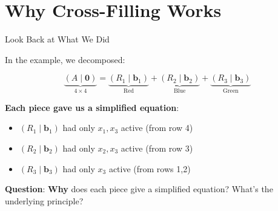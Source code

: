 \documentclass[10pt]{beamer}
\theoremstyle{definition}
\newcommand{\x}[1]{\alert{\textbf{#1}}}
\begin{document}
\section{Why Cross-Filling Works}

\begin{frame}{Look Back at What We Did}

In the example, we decomposed:

$$\underbrace{(A \mid \mathbf{0})}_{4 \times 4} = \underbrace{(R_1 \mid \mathbf{b}_1)}_{\text{Red}} + \underbrace{(R_2 \mid \mathbf{b}_2)}_{\text{Blue}} + \underbrace{(R_3 \mid \mathbf{b}_3)}_{\text{Green}}$$

\vspace{1em}

\x{Each piece gave us a simplified equation}:
\begin{itemize}
\item $(R_1 \mid \mathbf{b}_1)$ had only $x_1, x_3$ active (from row 4)
\item $(R_2 \mid \mathbf{b}_2)$ had only $x_2, x_3$ active (from row 3)
\item $(R_3 \mid \mathbf{b}_3)$ had only $x_3$ active (from rows 1,2)
\end{itemize}

\vspace{1em}

\x{Question}: \textbf{Why} does each piece give a simplified equation? What's the underlying principle?

\end{frame}
\end{document}
